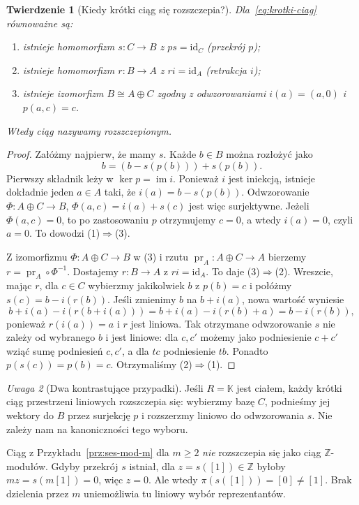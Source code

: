 \documentclass[11pt,a4paper,oneside]{report}
\newcommand{\Z}{\mathbb{Z}}
\newcommand{\id}{\mathrm{id}}
\theoremstyle{plain}
\newtheorem{twierdzenie}{Twierdzenie}[section]
\theoremstyle{definition}
\theoremstyle{remark}
\newtheorem{uwaga}[twierdzenie]{Uwaga}
\begin{document}
\begin{twierdzenie}[Kiedy krótki ciąg się rozszczepia?]
\label{thm:ses-rozszczepienie}
Dla~\eqref{eq:krotki-ciag} równoważne są:
\begin{enumerate}[leftmargin=*]
\item istnieje homomorfizm $s:C\to B$
      z $p s=\id_C$ (przekrój $p$);
\item istnieje homomorfizm $r:B\to A$
      z $r i=\id_A$ (retrakcja $i$);
\item istnieje izomorfizm $B\cong A\oplus C$
      zgodny z odwzorowaniami $i(a)=(a,0)$
      i $p(a,c)=c$.
\end{enumerate}
Wtedy ciąg nazywamy \emph{rozszczepionym}.
\end{twierdzenie}
\begin{proof}
Załóżmy najpierw, że mamy $s$.
Każde $b\in B$ można rozłożyć jako
\[
 b=(b-s(p(b)))+s(p(b)).
\]
Pierwszy składnik leży w $\ker p=\operatorname{im}i$.
Ponieważ $i$ jest iniekcją, istnieje dokładnie
jeden $a\in A$ taki, że $i(a)=b-s(p(b))$.
Odwzorowanie
$\Phi:A\oplus C\to B$, $\Phi(a,c)=i(a)+s(c)$
jest więc surjektywne. Jeżeli $\Phi(a,c)=0$,
to po zastosowaniu $p$ otrzymujemy $c=0$,
a wtedy $i(a)=0$, czyli $a=0$.
To dowodzi (1)$\Rightarrow$(3).

Z izomorfizmu $\Phi:A\oplus C\to B$ w (3) i rzutu
$\operatorname{pr}_A:A\oplus C\to A$ bierzemy
$r=\operatorname{pr}_A\circ\Phi^{-1}$. Dostajemy
$r:B\to A$ z $ri=\id_A$. To daje (3)$\Rightarrow$(2).
Wreszcie, mając $r$, dla $c\in C$ wybierzmy
jakikolwiek $b$ z $p(b)=c$ i połóżmy
$s(c)=b-i(r(b))$. Jeśli zmienimy $b$ na
$b+i(a)$, nowa wartość wyniesie
\[
 b+i(a)-i(r(b+i(a)))
 =b+i(a)-i(r(b)+a)=b-i(r(b)),
\]
ponieważ $r(i(a))=a$ i $r$ jest liniowa.
Tak otrzymane odwzorowanie $s$ nie zależy od
wybranego $b$ i jest liniowe: dla $c,c'$
możemy jako podniesienie $c+c'$ wziąć sumę
podniesień $c,c'$, a dla $tc$ podniesienie $tb$.
Ponadto $p(s(c))=p(b)=c$.
Otrzymaliśmy (2)$\Rightarrow$(1).
\end{proof}

\begin{uwaga}[Dwa kontrastujące przypadki]
Jeśli $R=\mathbb K$ jest ciałem, każdy krótki
ciąg przestrzeni liniowych rozszczepia się:
wybierzmy bazę $C$, podnieśmy jej wektory
do $B$ przez surjekcję $p$ i rozszerzmy
liniowo do odwzorowania $s$. Nie zależy nam na
kanoniczności tego wyboru.

Ciąg z Przykładu~\ref{prz:ses-mod-m} dla
$m\geq2$ \emph{nie} rozszczepia się jako
ciąg $\Z$-modułów. Gdyby przekrój $s$
istniał, dla $z=s([1])\in\Z$ byłoby
$mz=s(m[1])=0$, więc $z=0$.
Ale wtedy $\pi(s([1]))=[0]\ne[1]$.
Brak dzielenia przez $m$ uniemożliwia tu
liniowy wybór reprezentantów.
\end{uwaga}
\end{document}
